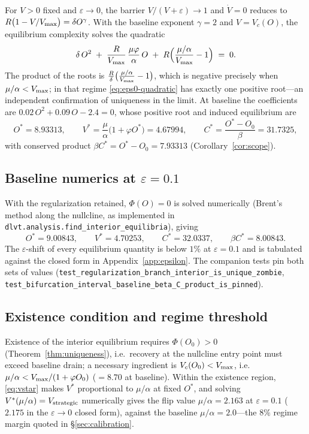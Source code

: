 For $V>0$ fixed and $\varepsilon\to0$, the barrier $V/(V+\varepsilon)\to1$
and $\dot V=0$ reduces to $R\bigl(1-V/V_{\max}\bigr)=\delta O^{\gamma}$. With
the baseline exponent $\gamma=2$ and $V=V_c(O)$, the equilibrium complexity
solves the quadratic
\begin{equation}
\label{eq:eps0-quadratic}
\delta\,O^{2}
\;+\;\frac{R}{V_{\max}}\,\frac{\mu\varphi}{\alpha}\,O
\;+\;R\Bigl(\frac{\mu/\alpha}{V_{\max}}-1\Bigr)
\;=\;0 .
\end{equation}
The product of the roots is
$\tfrac{R}{\delta}\bigl(\tfrac{\mu/\alpha}{V_{\max}}-1\bigr)$, which is
negative precisely when $\mu/\alpha<V_{\max}$; in that regime
\eqref{eq:eps0-quadratic} has exactly one positive root---an independent
confirmation of uniqueness in the limit. At baseline the coefficients are
$0.02\,O^{2}+0.09\,O-2.4=0$, whose positive root and induced equilibrium are
\[
O^{*} = 8.93313,\qquad
V^{*} = \frac{\mu}{\alpha}\bigl(1+\varphi O^{*}\bigr) = 4.67994,\qquad
C^{*} = \frac{O^{*}-O_0}{\beta} = 31.7325 ,
\]
with conserved product $\beta C^{*}=O^{*}-O_0=7.93313$
(Corollary~\ref{cor:scope}).

\subsection{Baseline numerics at $\varepsilon=0.1$}

With the regularization retained, $\Phi(O)=0$ is solved numerically
(Brent's method along the nullcline, as implemented in
\texttt{dlvt.analysis.find\_interior\_equilibria}), giving
\[
O^{*}=9.00843,\qquad V^{*}=4.70253,\qquad C^{*}=32.0337,\qquad
\beta C^{*}=8.00843 .
\]
The $\varepsilon$-shift of every equilibrium quantity is below $1\%$ at
$\varepsilon=0.1$ and is tabulated against the closed form in
Appendix~\ref{app:epsilon}. The companion tests pin both sets of values
(\texttt{test\_regularization\_branch\_interior\_is\_unique\_zombie},
\texttt{test\_bifurcation\_interval\_baseline\_beta\_C\_product\_is\_pinned}).

\subsection{Existence condition and regime threshold}

Existence of the interior equilibrium requires $\Phi(O_0)>0$
(Theorem~\ref{thm:uniqueness}), i.e.\ recovery at the nullcline entry point
must exceed baseline drain; a necessary ingredient is
$V_c(O_0)<V_{\max}$, i.e.\ $\mu/\alpha<V_{\max}/(1+\varphi O_0)$ ($=8.70$ at
baseline). Within the existence region, \eqref{eq:vstar} makes
$V^{*}$ proportional to $\mu/\alpha$ at fixed $O^{*}$, and solving
$V^{*}(\mu/\alpha)=V_{\mathrm{strategic}}$ numerically gives the flip value
$\mu/\alpha=2.163$ at $\varepsilon=0.1$ ($2.175$ in the $\varepsilon\to0$
closed form), against the baseline $\mu/\alpha=2.0$---the $8\%$ regime
margin quoted in \S\ref{sec:calibration}.
